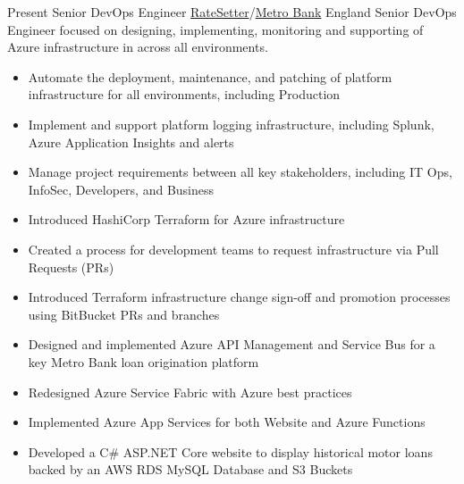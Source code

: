 
\begin{twenty}
  {Present}
  {Senior DevOps Engineer}
  {\href{https://www.ratesetter.com/}{RateSetter}/\href{https://metrobankonline.co.uk}{Metro Bank}}
  {England}
  {Senior DevOps Engineer focused on designing, implementing, monitoring and supporting of Azure infrastructure in across all environments.}
  {\begin{itemize}
    \item Automate the deployment, maintenance, and patching of platform infrastructure for all environments, including Production
    \item Implement and support platform logging infrastructure, including Splunk, Azure Application Insights and alerts
    \item Manage project requirements between all key stakeholders, including IT Ops, InfoSec, Developers, and Business
  \end{itemize}}
  {\begin{itemize}
    \item Introduced HashiCorp Terraform for Azure infrastructure
    \item Created a process for development teams to request infrastructure via Pull Requests (PRs)
    \item Introduced Terraform infrastructure change sign-off and promotion processes using BitBucket PRs and branches
    \item Designed and implemented Azure API Management and Service Bus for a key Metro Bank loan origination platform
    \item Redesigned Azure Service Fabric with Azure best practices
    \item Implemented Azure App Services for both Website and Azure Functions
    \item Developed a C\# ASP.NET Core website to display historical motor loans backed by an AWS RDS MySQL Database and S3 Buckets
  \end{itemize}
  }
\end{twenty}

